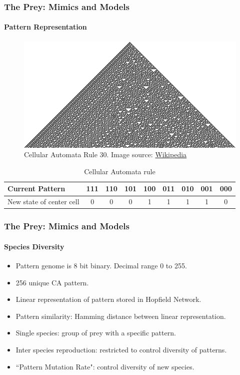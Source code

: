 \frame
{
	\frametitle{The Prey: Mimics and Models}
	\framesubtitle{Pattern Representation}

	\begin{figure}[H]
		\centering
		\includegraphics[scale=3]{../tex/images/CA_rule30s}
		\caption{Cellular Automata Rule 30.
		Image source: \href{http://en.wikipedia.org/wiki/Cellular_automata}{Wikipedia}}
		\label{fig:cellular-automata-rule-30}
	\end{figure}
	
	\begin{table}
		\centering
		\begin{scriptsize}
		\begin{tabular}{| p{2cm} | c | c | c | c | c | c | c | c |}
		  \hline
		  Current Pattern & 111 & 110 & 101 & 100 & 011 & 010 & 001 & 000 \\ \hline
		  New state of center cell & 0 & 0 & 0 & 1 & 1 & 1 & 1 & 0 \\
		  \hline
		\end{tabular}
		\end{scriptsize}		
		\caption{Cellular Automata rule}
		\label{tab:cellular-automata-rule}
	\end{table}
}

\frame
{
	\frametitle{The Prey: Mimics and Models}
	\framesubtitle{Species Diversity}

	\begin{itemize}
		\item Pattern genome is 8 bit binary. Decimal range 0 to 255.
		\item 256 unique CA pattern.
		\item Linear representation of pattern stored in Hopfield Network.
		\item Pattern similarity: Hamming distance between linear representation.
		\item Single species: group of prey with a specific pattern.
		\item Inter species reproduction: restricted to control diversity of patterns.
		\item ``Pattern Mutation Rate": control diversity of new species.
	\end{itemize}
}

